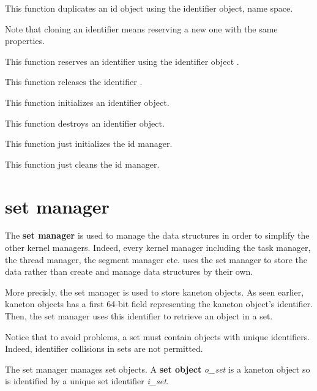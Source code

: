 	 {
	   This function duplicates an id object using the 
	   identifier object, name space.

	   Note that cloning an identifier means reserving a new one
	   with the same properties.
	 }

	  {
	    This function reserves an identifier  using the
	    identifier object .
	  }

	 {
	   This function releases the identifier .
	 }

	 {
	   This function initializes an identifier object.
	 }

	 {
	   This function destroys an identifier object.
	 }

	 {
	   This function just initializes the id manager.
	 }

	 {
	   This function just cleans the id manager.
	 }

%
%

\section{set manager}

The \textbf{set manager} is used to manage the data structures in order
to simplify the other kernel managers. Indeed, every kernel manager
including the task manager, the thread manager, the segment manager etc.
uses the set manager to store the data rather than create and manage data
structures by their own.

More precisly, the set manager is used to store kaneton objects.
As seen earlier, kaneton objects has a first 64-bit field representing
the kaneton object's identifier. Then, the set manager uses this identifier
to retrieve an object in a set.

Notice that to avoid problems, a set must contain objects with unique
identifiers. Indeed, identifier collisions in sets are not permitted.

The set manager manages set objects. A \textbf{set object} \textit{o\_set}
is a kaneton object so is identified by a unique set identifier
\textit{i\_set}.

